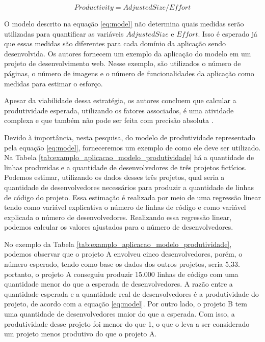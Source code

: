  
 

\begin{equation}
\label{eq:model}
  Productivity = AdjustedSize/Effort
\end{equation}


O modelo descrito na equação \ref{eq:model} não determina quais medidas serão utilizadas para quantificar as variáveis $AdjustedSize$ e $Effort$. Isso é esperado já que essas medidas são diferentes para cada domínio da aplicação sendo desenvolvida. Os autores fornecem um exemplo da aplicação do modelo em um projeto de desenvolvimento web. Nesse exemplo, são utilizados o número de páginas, o número de imagens e o número de funcionalidades da aplicação como medidas para estimar o esforço. 

Apesar da viabilidade dessa estratégia, os autores  concluem que calcular a produtividade esperada, utilizando os  fatores associados, é uma atividade complexa e que também não pode ser feita com precisão absoluta \cite{petersen2011measuring}.

Devido à importância, nesta pesquisa, do modelo de produtividade representado pela equação \ref{eq:model}, forneceremos um exemplo de como ele deve ser utilizado. Na Tabela \ref{tab:examplo_aplicacao_modelo_produtividade} há a quantidade de linhas produzidas e a quantidade de desenvolvedores de três projetos fictícios. Podemos estimar, utilizando os dados desses três projetos, qual seria a quantidade de desenvolvedores necessários para produzir a quantidade de linhas de código do projeto. Essa estimação é realizada por meio de uma regressão linear\cite{degroot2012probability} tendo como variável explicativa o número de linhas de código e como variável explicada o número de desenvolvedores. Realizando essa regressão linear, podemos calcular os valores ajustados para o número de desenvolvedores.

No exemplo da Tabela \ref{tab:examplo_aplicacao_modelo_produtividade}, podemos observar que o projeto A envolveu cinco desenvolvedores, porém, o número esperado, tendo como base os dados dos outros projetos, seria 5,33.  portanto, o projeto A conseguiu produzir 15.000 linhas de código com uma quantidade menor do que  a esperada de desenvolvedores. A razão entre a quantidade esperada e a quantidade real de desenvolvedores é a produtividade do projeto, de acordo com a equação \ref{eq:model}. Por outro lado, o projeto B tem uma quantidade de desenvolvedores maior do que a esperada. Com isso, a produtividade desse projeto foi menor do que 1, o que o leva a ser considerado um projeto menos produtivo do que o projeto A.

